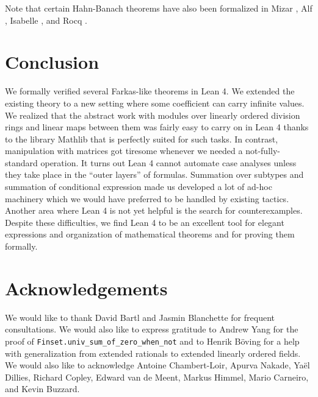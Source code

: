 \documentclass[]{article}
\renewcommand{\.}{\hskip .75pt}
\begin{document}
Note that certain Hahn-Banach theorems have also
been formalized in Mizar \cite{HahnBanach-Mizar},
Alf \cite{HahnBanach-Alf}, Isabelle \cite{HahnBanach-Isabelle},
and Rocq \cite{HahnBanach-Coq}.


\section {Conclusion}

We formally verified several Farkas-like theorems in Lean 4.
We extended the existing theory to a new setting where some
coefficient can carry infinite values. We realized that the
abstract work with modules over linearly ordered division rings
and linear maps between them was fairly easy to carry on in
Lean 4 thanks to the library Mathlib that is perfectly suited
for such tasks. In contrast, manipulation with matrices got
tiresome whenever we needed a not-fully-standard operation.
It turns out Lean 4 cannot automate case analyses unless they
take place in the ``outer layers'' of formulas. Summation
over subtypes and summation of conditional expression made
us developed a lot of ad-hoc machinery which we would have
preferred to be handled by existing tactics. Another area
where Lean 4 is not yet helpful is the search for counterexamples.
Despite these difficulties, we find Lean 4 to be an excellent
tool for elegant expressions and organization of
mathematical theorems and for proving them formally.



\section*{Acknowledgements}

We would like to thank David Bartl and Jasmin Blanchette for
frequent consultations.
We would also like to express gratitude to Andrew Yang for
the proof of \texttt{Finset.univ\_sum\_of\_zero\_when\_not}
and to Henrik Böving for a help with generalization from
extended rationals to extended linearly ordered fields.
We would also like to acknowledge Antoine Chambert-Loir,
Apurva Nakade, Yaël Dillies, Richard Copley,
Edward van de Meent, Markus Himmel, Mario Carneiro,
and Kevin Buzzard.







%
\end{document}
